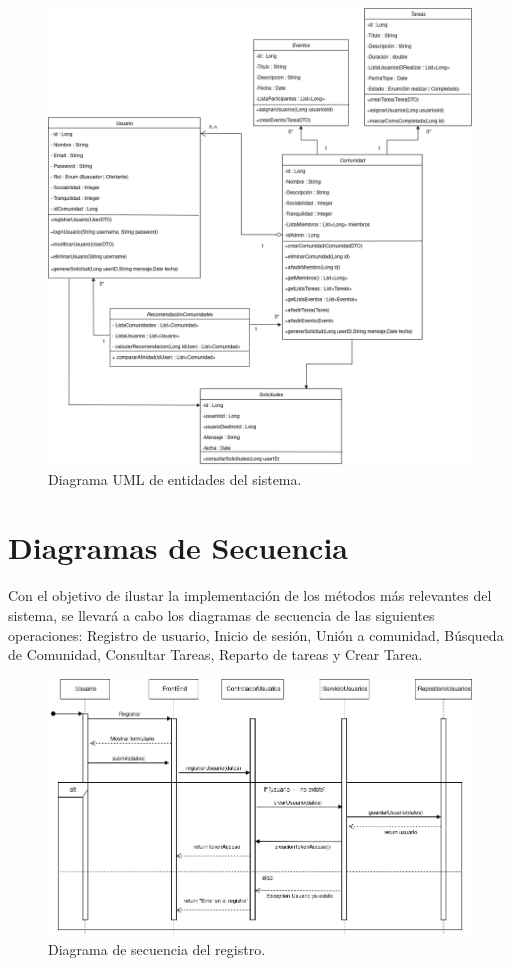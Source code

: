 \begin{figure}[H]
    \centering
    \includegraphics[width=1\textwidth]{fotos/UML5.png}
    \caption{Diagrama UML de entidades del sistema.}
\end{figure}

\section{Diagramas de Secuencia}
Con el objetivo de ilustar la implementación de los métodos más relevantes del sistema, se llevará a cabo los diagramas de secuencia de las siguientes operaciones: Registro de usuario, Inicio de sesión, Unión a comunidad, Búsqueda de Comunidad, Consultar Tareas, Reparto de tareas y Crear Tarea.

\begin{figure}[H]
    \centering
    \includegraphics[width=\textwidth]{fotos/1-secuencia.png}
    \caption{Diagrama de secuencia del registro.}
    \label{fig:diagrama_arquitectura}
\end{figure}

